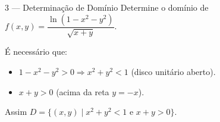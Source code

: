 \begin{exbox}{3 --- Determinação de Domínio}
  Determine o domínio de $f(x,y)=\dfrac{\ln(1-x^2-y^2)}{\sqrt{x+y}}$.
\end{exbox}
\begin{solbox}
  É necessário que:
  \begin{itemize}
    \item $1-x^2-y^2>0 \Rightarrow x^2+y^2 < 1$ (disco unitário aberto).
    \item $x+y>0$ (acima da reta $y=-x$).
  \end{itemize}
  Assim $D = \{(x,y)\mid x^2+y^2<1 \text{ e } x+y>0\}$.
\end{solbox}
